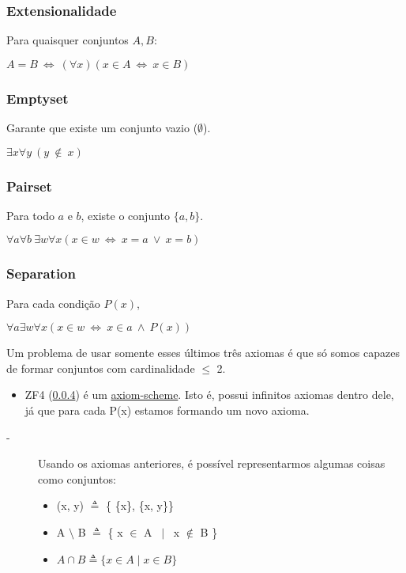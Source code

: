 \documentclass[12pt, a4paper]{article}
\begin{document}
\subsubsection{Extensionalidade}
\label{sec:extensionalidade}
Para quaisquer conjuntos $A, B$:\\
\begin{center}
$ A = B ~ \iff ~ (\forall x ) (x \in A ~ \iff ~ x \in B) $
\end{center}
\subsubsection{Emptyset}
\label{sec:emptyset}
Garante que existe um conjunto vazio ($\emptyset$). \\
\begin{center}
$ \exists x \forall y ~ (y~\notin~x) $
\end{center}
\subsubsection{Pairset}
Para todo $a$ e $b$, existe o conjunto $\{a,b\}$.\\
\begin{center}
$ {\forall a} {\forall b} ~ {\exists w} {\forall x} (x \in w ~ \iff ~ x = a ~\vee~ x = b ) $
\end{center}
\subsubsection{Separation}
\label{sec:separation}
Para cada condição $P(x)$,\\
\begin{center}
$ \forall a \exists w \forall x (x \in w ~ \iff ~ x \in a ~\wedge~ P(x) )$
\end{center}

Um problema de usar somente esses últimos três axiomas é que só somos capazes de formar
conjuntos com cardinalidade $\leq$ 2.
\begin{itemize}
\item ZF4 (\ref{sec:separation}) é um  \underline{axiom-scheme}. Isto é, possui infinitos axiomas dentro dele, já que
para cada P(x) estamos formando um novo axioma.
\end{itemize}

\begin{description}
\item[-] Usando os axiomas anteriores, é possível representarmos algumas coisas como conjuntos:
\begin{itemize}
\item (x, y) $\triangleq$ \{ \{x\}, \{x, y\}\}	\label{teste}
\item A $\setminus$ B $\triangleq$ \{ x $\in$ A ~$\mid$~ x $\notin$ B \}
\item $ A \cap B \triangleq \{ x \in A \mid x \in B \} $
\end{itemize}
\end{description}
\end{document}
